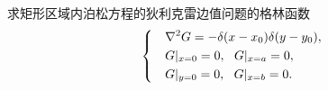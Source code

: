 \begin{yyEx}
	求矩形区域内泊松方程的狄利克雷边值问题的格林函数
	\begin{equation*}
	\begin{dcases}
	&\nabla^2G = -\delta(x-x_0)\delta(y-y_0),~\\
	&G|_{x= 0} = 0,~~G|_{x = a} = 0,\\
	&G|_{y= 0} = 0,~~G|_{x = b} = 0.
	\end{dcases}
	\end{equation*}
\end{yyEx}